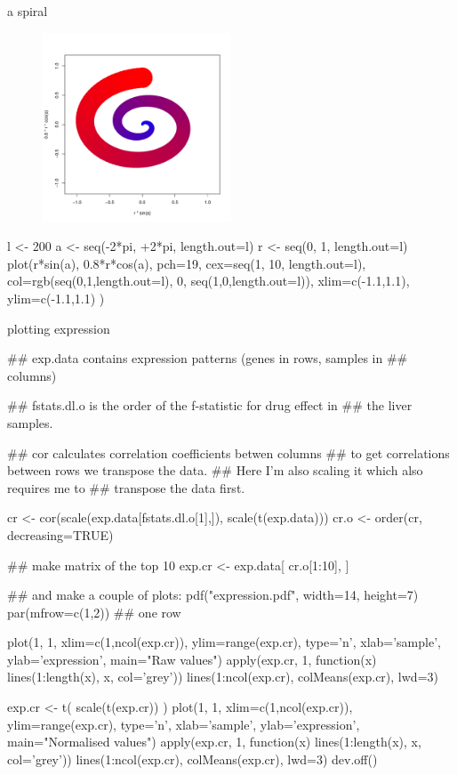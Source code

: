 \documentclass[pdf]{beamer}
\begin{document}
\begin{frame}[fragile]{a spiral}
  \begin{figure}[ht]
    \includegraphics[width=0.5\textwidth]{images/spiral}
  \end{figure}
  \begin{rcode}
    l <- 200
    a <- seq(-2*pi, +2*pi, length.out=l)
    r <- seq(0, 1, length.out=l)
    plot(r*sin(a), 0.8*r*cos(a), pch=19, cex=seq(1, 10, length.out=l),
         col=rgb(seq(0,1,length.out=l), 0, seq(1,0,length.out=l)), xlim=c(-1.1,1.1),
         ylim=c(-1.1,1.1) )
  \end{rcode}
  
\end{frame}

\begin{frame}[fragile]{plotting expression}
  \begin{rcode}
    ## exp.data contains expression patterns (genes in rows, samples in
    ## columns)

    ## fstats.dl.o is the order of the f-statistic for drug effect in
    ## the liver samples.

    ## cor calculates correlation coefficients betwen columns
    ## to get correlations between rows we transpose the data.
    ## Here I'm also scaling it which also requires me to
    ## transpose the data first.

    cr <- cor(scale(exp.data[fstats.dl.o[1],]), scale(t(exp.data)))
    cr.o <- order(cr, decreasing=TRUE)

    ## make matrix of the top 10
    exp.cr <- exp.data[ cr.o[1:10], ]
    
    ## and make a couple of plots:
    pdf("expression.pdf", width=14, height=7)
    par(mfrow=c(1,2))   ## one row

    plot(1, 1, xlim=c(1,ncol(exp.cr)), ylim=range(exp.cr), type='n', xlab='sample', 
         ylab='expression', main="Raw values")
    apply(exp.cr, 1, function(x){ lines(1:length(x), x, col='grey')})
    lines(1:ncol(exp.cr), colMeans(exp.cr), lwd=3)
    
    exp.cr <- t( scale(t(exp.cr)) )
    plot(1, 1, xlim=c(1,ncol(exp.cr)), ylim=range(exp.cr), type='n', xlab='sample', 
         ylab='expression', main="Normalised values")
    apply(exp.cr, 1, function(x){ lines(1:length(x), x, col='grey')})
    lines(1:ncol(exp.cr), colMeans(exp.cr), lwd=3)
    dev.off()
  \end{rcode}
\end{frame}
\end{document}
